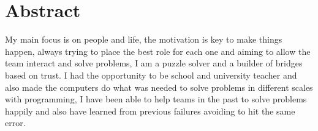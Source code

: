 \section{Abstract}

My main focus is on people and life, the motivation is key to make things
happen, always trying to place the best role for each one and aiming to
allow the team interact and solve problems, I am a puzzle solver and a 
builder of bridges based on trust. I had the opportunity to be school and
university teacher and also made the computers do what was needed to solve
problems in different scales with programming, I have been able to help
teams in the past to solve problems happily and also have learned from
previous failures avoiding to hit the same error.
